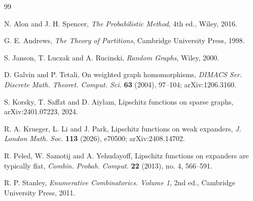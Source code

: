 \documentclass[11pt]{article}
\theoremstyle{definition}
\begin{document}
\begin{thebibliography}{99}

N. Alon and J. H. Spencer,
\textit{The Probabilistic Method},
4th ed., Wiley, 2016.

G. E. Andrews,
\textit{The Theory of Partitions},
Cambridge University Press, 1998.

S. Janson, T. Luczak and A. Rucinski,
\textit{Random Graphs},
Wiley, 2000.

D. Galvin and P. Tetali,
On weighted graph homomorphisms,
\textit{DIMACS Ser. Discrete Math. Theoret. Comput. Sci.} \textbf{63} (2004), 97--104; arXiv:1206.3160.

S. Korsky, T. Saffat and D. Aiylam,
Lipschitz functions on sparse graphs,
arXiv:2401.07223, 2024.

R. A. Krueger, L. Li and J. Park,
Lipschitz functions on weak expanders,
\textit{J. London Math. Soc.} \textbf{113} (2026), e70500; arXiv:2408.14702.

R. Peled, W. Samotij and A. Yehudayoff,
Lipschitz functions on expanders are typically flat,
\textit{Combin. Probab. Comput.} \textbf{22} (2013), no. 4, 566--591.

R. P. Stanley,
\textit{Enumerative Combinatorics. Volume 1},
2nd ed., Cambridge University Press, 2011.

\end{thebibliography}
\end{document}
